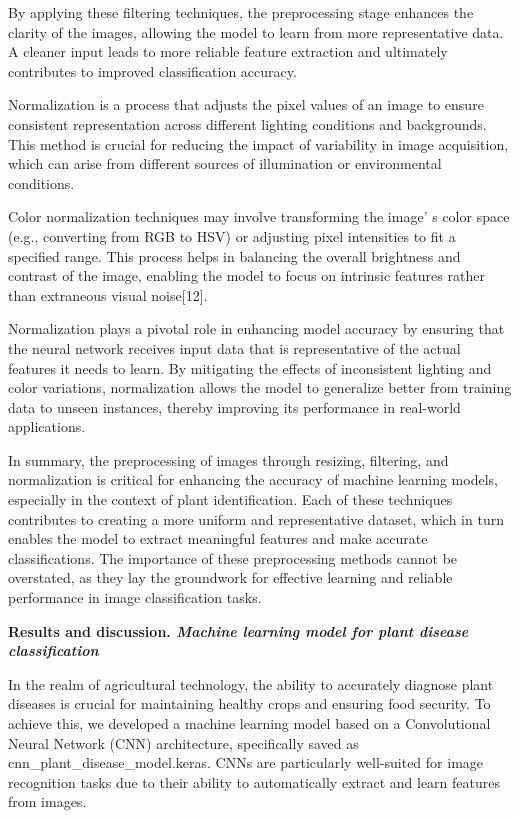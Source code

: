 \begin{multicols}{2}
By applying these filtering techniques, the preprocessing stage enhances
the clarity of the images, allowing the model to learn from more
representative data. A cleaner input leads to more reliable feature
extraction and ultimately contributes to improved classification
accuracy.

Normalization is a process that adjusts the pixel values of an image to
ensure consistent representation across different lighting conditions
and backgrounds. This method is crucial for reducing the impact of
variability in image acquisition, which can arise from different sources
of illumination or environmental conditions.

Color normalization techniques may involve transforming the
image' s color space (e.g., converting from RGB to HSV)
or adjusting pixel intensities to fit a specified range. This process
helps in balancing the overall brightness and contrast of the image,
enabling the model to focus on intrinsic features rather than extraneous
visual noise{[}12{]}.

Normalization plays a pivotal role in enhancing model accuracy by
ensuring that the neural network receives input data that is
representative of the actual features it needs to learn. By mitigating
the effects of inconsistent lighting and color variations, normalization
allows the model to generalize better from training data to unseen
instances, thereby improving its performance in real-world applications.

In summary, the preprocessing of images through resizing, filtering, and
normalization is critical for enhancing the accuracy of machine learning
models, especially in the context of plant identification. Each of these
techniques contributes to creating a more uniform and representative
dataset, which in turn enables the model to extract meaningful features
and make accurate classifications. The importance of these preprocessing
methods cannot be overstated, as they lay the groundwork for effective
learning and reliable performance in image classification tasks.

{\bfseries Results and discussion. \emph{Machine learning model for plant
disease classification}}

In the realm of agricultural technology, the ability to accurately
diagnose plant diseases is crucial for maintaining healthy crops and
ensuring food security. To achieve this, we developed a machine learning
model based on a Convolutional Neural Network (CNN) architecture,
specifically saved as cnn\_plant\_disease\_model.keras. CNNs are
particularly well-suited for image recognition tasks due to their
ability to automatically extract and learn features from images.


\end{multicols}
